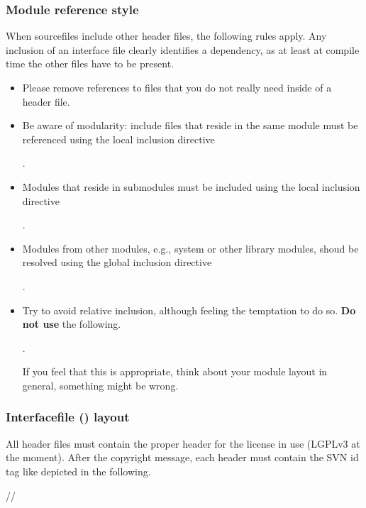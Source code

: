 \subsubsection{Module reference style}
When sourcefiles include other header files, the following rules apply.
Any inclusion of an interface file clearly identifies a dependency, as at least at compile time the other files have to be present.
\begin{itemize}
\item Please remove references to files that you do not really need inside of a header file.
\item Be aware of modularity: include files that reside in the same module must be referenced using the local inclusion directive 

.
\item Modules that reside in submodules must be included using the local inclusion directive 

.
\item Modules from other modules, e.g., system or other library modules, shoud be resolved using the global inclusion directive 

.
\item Try to avoid relative inclusion, although feeling the temptation to do so. \textbf{Do not use} the following.

.

If you feel that this is appropriate, think about your module layout in general, something might be wrong.
\end{itemize}

\subsubsection{Interfacefile () layout}
All header files must contain the proper header for the license in use (LGPLv3 at the moment).
After the copyright message, each header must contain the SVN id tag like depicted in the following.

// 

